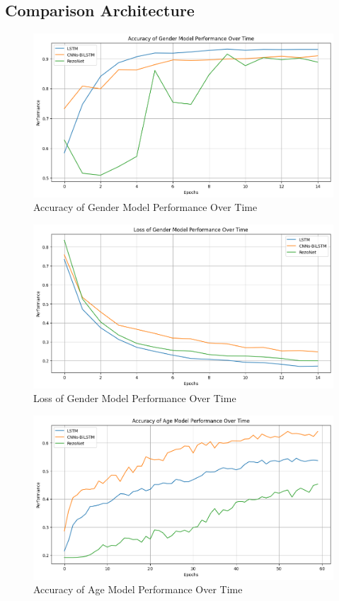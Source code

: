 \documentclass[conference, 10pt,onecolumn]{IEEEtran}
\begin{document}
\subsection{Comparison Architecture}
\begin{figure}
    \centering
    \includegraphics[width=4 in]{Gender_valid.png}
    \caption{Accuracy of Gender Model Performance Over Time}
    \label{fig:Gender_valid}
\end{figure}

\begin{figure}
    \centering
    \includegraphics[width=4 in]{Loss_Gender_valid.png}
    \caption{Loss of Gender Model Performance Over Time}
    \label{fig:Loss_Gender_valid}
\end{figure}

\begin{figure}
    \centering
    \includegraphics[width=4 in]{Accuracy_Age_valid.png}
    \caption{Accuracy of Age Model Performance Over Time}
    \label{fig:Age_valid}
\end{figure}
\end{document}
